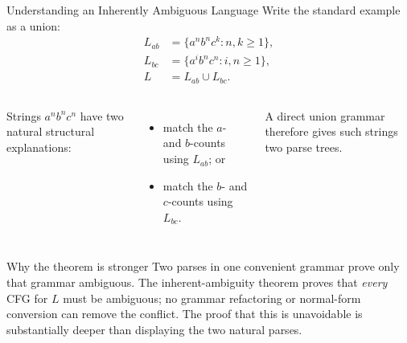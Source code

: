 \documentclass[10pt]{beamer}
\begin{document}
\begin{frame}{Understanding an Inherently Ambiguous Language}
  \small
  Write the standard example as a union:
  \[
    \begin{aligned}
      L_{ab}&=\{a^n b^n c^k:n,k\ge1\},\\
      L_{bc}&=\{a^i b^n c^n:i,n\ge1\},\\
      L&=L_{ab}\cup L_{bc}.
    \end{aligned}
  \]
  \begin{columns}[T]
    \centering
    Strings $a^n b^n c^n$ have two natural structural explanations:
    \begin{itemize}
      \item match the $a$- and $b$-counts using $L_{ab}$; or
      \item match the $b$- and $c$-counts using $L_{bc}$.
    \end{itemize}
    A direct union grammar therefore gives such strings two parse trees.
  \end{columns}
  \begin{alertblock}{Why the theorem is stronger}
    Two parses in one convenient grammar prove only that grammar ambiguous.
    The inherent-ambiguity theorem proves that \emph{every} CFG for $L$ must
    be ambiguous; no grammar refactoring or normal-form conversion can remove
    the conflict. The proof that this is unavoidable is substantially deeper
    than displaying the two natural parses.
  \end{alertblock}
\end{frame}
\end{document}
